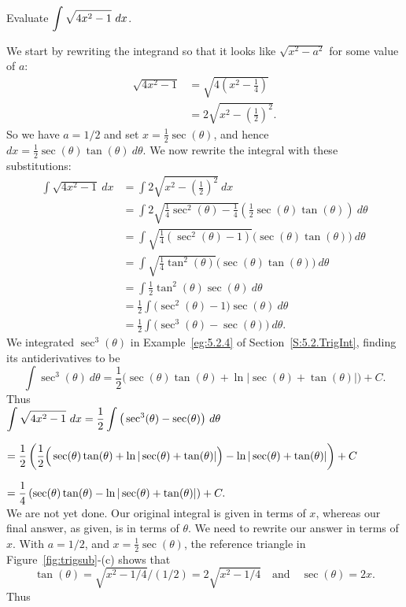 \begin{example} \label{eg:5.3.3} %

Evaluate $\ds \int \sqrt{4x^2-1}\ dx$.

\solution
We start by rewriting the integrand so that it looks like $\sqrt{x^2-a^2}$ for some value of $a$:
\begin{align*}
\sqrt{4x^2-1} &= \sqrt{4\left(x^2-\frac14\right)}\\
		&= 2\sqrt{x^2-\left(\frac12\right)^2}.
\end{align*}
So we have $a=1/2$ and set $x= \frac12\sec(\theta)$, and hence $dx = \frac12\sec(\theta)\tan(\theta)\ d\theta$. %
We now rewrite the integral with these substitutions:
\begin{align*}
\int \sqrt{4x^2-1}\ dx &= \int 2\sqrt{x^2-\left(\frac12\right)^2}\ dx\\
			&= \int 2\sqrt{\frac14\sec^2(\theta) - \frac14}\left(\frac12\sec(\theta)\tan(\theta)\right)\ d\theta\\
			&=\int \sqrt{\frac14(\sec^2(\theta)-1)}\Big(\sec(\theta)\tan(\theta)\Big)\ d\theta\\
			&=\int\sqrt{\frac14\tan^2(\theta)}\Big(\sec(\theta)\tan(\theta)\Big)\ d\theta\\
			&=\int \frac12\tan^2(\theta)\sec(\theta)\ d\theta\\
			&=\frac12\int \Big(\sec^2(\theta)-1\Big)\sec(\theta)\ d\theta\\
			&=\frac12\int \big(\sec^3(\theta) - \sec(\theta)\big)\ d\theta.
\end{align*}
We integrated $\sec^3(\theta)$ in Example~\ref{eg:5.2.4} of Section~\ref{S:5.2.TrigInt}, finding its antiderivatives to be
$$\int \sec^3(\theta)\ d\theta = \frac12\Big(\sec(\theta)\tan (\theta) + \ln|\sec (\theta)+\tan (\theta)|\Big)+C.$$
Thus\\

\noindent$ \displaystyle\int \sqrt{4x^2-1}\ dx =\frac12\int \big(\sec^3(\theta) - \sec(\theta)\big)\ d\theta$

\noindent$ \displaystyle= \frac12\left(\frac12\Big(\sec(\theta)\tan (\theta) + \ln|\sec (\theta)+\tan (\theta)|\Big) -\ln|\sec(\theta) + \tan(\theta)|\right) + C$

\noindent$\displaystyle = \frac14\left(\sec(\theta)\tan(\theta) -\ln|\sec(\theta)+\tan(\theta)|\right)+C.$\\

We are not yet done. Our original integral is given in terms of $x$, whereas our final answer, as given, is in terms of $\theta$. We need to rewrite our answer in terms of $x$. With $a=1/2$, and $x=\frac12\sec(\theta)$, the reference triangle in Figure~\ref{fig:trigsub}-(c) shows that 
$$\tan (\theta) = \sqrt{x^2-1/4}/(1/2) = 2\sqrt{x^2-1/4}\quad \text{and}\quad \sec(\theta) = 2x.$$
Thus \\


\end{example}

